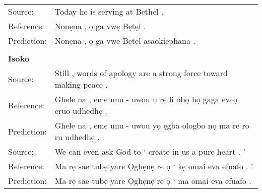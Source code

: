 \documentclass{article} %
\begin{document}
\begin{table}[h]
\begin{center}
\begin{tabular}{ll}
	Source:    &   Today he is serving at Bethel . \\ 
	Reference:  &  Nonẹna , \d{o} ga vw\d{e} B\d{e}t\d{e}l .\\
	Prediction: &  Nonẹna , \d{o} ga vw\d{e} B\d{e}t\d{e}l asaọkiephana . \\
	\bottomrule
	\\
    \textbf{Isoko}  & \\
     \midrule
     \midrule
	Source:      & Still , words of apology are a strong force toward making peace . \\
	Reference:   & Ghele na , eme unu - uwou u re fi ob\d{o} h\d{o} gaga eva\d{o} eruo udhedh\d{e} .\\
	Prediction:  & Ghele na , eme unu - uwou y\d{o} \d{e}gba ologbo n\d{o} ma re ro ru udhedh\d{e} .\\
  \midrule
	 Source:   & We can even ask God to ‘ create in us a pure heart . ’ \\
	Reference:  & Ma r\d{e} sae tub\d{e} yare \d{O}gh\d{e}n\d{e} re \d{o}  ‘ kẹ omai eva efuafo . ’ \\
	Prediction: & Ma r\d{e} sae tub\d{e} yare \d{O}gh\d{e}n\d{e} re \d{o}  ‘ ma omai eva efuafo .  \\
	 \bottomrule
     
  \end{tabular}
\end{center}
\end{table}
\end{document}
